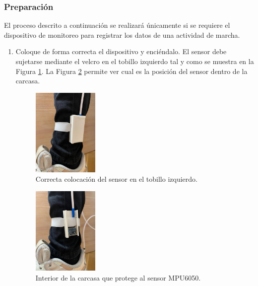 \subsubsection{Preparación}
El proceso descrito a continuación se realizará únicamente si se requiere el dispositivo de monitoreo para registrar los datos de una actividad de marcha.

\begin{enumerate}
    \item Coloque de forma correcta el dispositivo y enciéndalo. El sensor debe sujetarse mediante el velcro en el tobillo izquierdo tal y como se muestra en la Figura \ref{fig:sensor1}. La Figura \ref{fig:sensor2} permite ver cual es la posición del sensor dentro de la carcasa.
    \begin{figure}[h]
        \centering
        \includegraphics[width=0.3\textwidth]{img/B3_Manual/sensor1.jpg}
        \caption{Correcta colocación del sensor en el tobillo izquierdo.}
        \label{fig:sensor1}
    \end{figure}
    
    \begin{figure}[h]
        \centering
        \includegraphics[width=0.3\textwidth]{img/B3_Manual/sensor2.jpg}
        \caption{Interior de la carcasa que protege al sensor MPU6050.}
        \label{fig:sensor2}
    \end{figure}
    

\end{enumerate}
